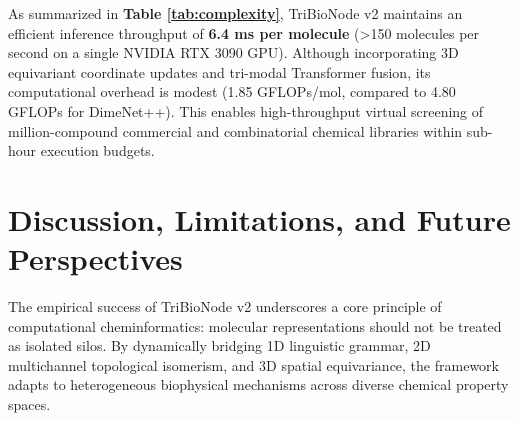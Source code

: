 \documentclass[10pt,twocolumn]{article}
\begin{document}
\begin{table}[!htbp]
\centering
\caption{Model Complexity, FLOPs, and Inference Throughput (Batch Size = 64, RTX 3090 GPU).}
\label{tab:complexity}
\renewcommand{\arraystretch}{1.20}
\setlength{\tabcolsep}{3pt}
\small
{}
\end{table}

As summarized in \textbf{Table \ref{tab:complexity}}, TriBioNode v2 maintains an efficient inference throughput of \textbf{6.4 ms per molecule} (>150 molecules per second on a single NVIDIA RTX 3090 GPU). Although incorporating 3D equivariant coordinate updates and tri-modal Transformer fusion, its computational overhead is modest (1.85 GFLOPs/mol, compared to 4.80 GFLOPs for DimeNet++). This enables high-throughput virtual screening of million-compound commercial and combinatorial chemical libraries within sub-hour execution budgets.

\FloatBarrier
\section{Discussion, Limitations, and Future Perspectives}

The empirical success of TriBioNode v2 underscores a core principle of computational cheminformatics: molecular representations should not be treated as isolated silos. By dynamically bridging 1D linguistic grammar, 2D multichannel topological isomerism, and 3D spatial equivariance, the framework adapts to heterogeneous biophysical mechanisms across diverse chemical property spaces.
\end{document}
